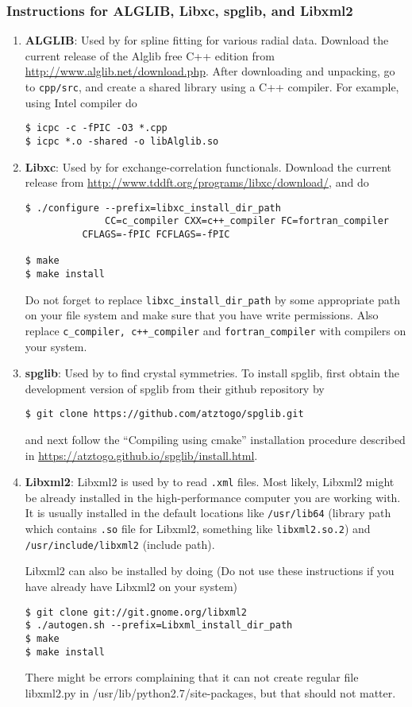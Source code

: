 \subsubsection{Instructions for ALGLIB, Libxc, spglib, and Libxml2}
\begin{enumerate}
	\item   {\bf ALGLIB}: Used by \dftfe{} for spline fitting for various radial data. Download the current release of the Alglib free C++ edition from \url{http://www.alglib.net/download.php}. After downloading and unpacking, go to \verb|cpp/src|, and create a shared library using a C++ compiler. For example, using Intel compiler do
\begin{verbatim}
$ icpc -c -fPIC -O3 *.cpp
$ icpc *.o -shared -o libAlglib.so
\end{verbatim}
\item {\bf Libxc}: Used by \dftfe{} for exchange-correlation functionals. Download the current release from \url{http://www.tddft.org/programs/libxc/download/}, and do 
\begin{verbatim}
$ ./configure --prefix=libxc_install_dir_path
              CC=c_compiler CXX=c++_compiler FC=fortran_compiler
	      CFLAGS=-fPIC FCFLAGS=-fPIC
     
$ make
$ make install
\end{verbatim}
Do not forget to replace \verb|libxc_install_dir_path| by some appropriate path on your file system and make sure that you have write permissions. Also replace \verb|c_compiler, c++_compiler| and \verb|fortran_compiler| with compilers on your system.

\item {\bf spglib}: Used by \dftfe{} to find crystal symmetries. To install spglib, first obtain the development version of spglib from their github repository by
\begin{verbatim}
$ git clone https://github.com/atztogo/spglib.git	
\end{verbatim}	
and next follow the ``Compiling using cmake'' installation procedure described in \url{https://atztogo.github.io/spglib/install.html}.   	

\item {\bf Libxml2}: Libxml2 is used by \dftfe{} to read \verb|.xml| files. Most likely, Libxml2 might be already installed in the high-performance computer you are working with. It is usually installed in the default locations like \verb|/usr/lib64| (library path which contains \verb|.so| file for Libxml2, something like \verb|libxml2.so.2|) and \verb|/usr/include/libxml2| (include path). 

Libxml2 can also be installed by doing (Do not use these instructions if you have already have Libxml2 on your system)
\begin{verbatim}
$ git clone git://git.gnome.org/libxml2
$ ./autogen.sh --prefix=Libxml_install_dir_path
$ make
$ make install 
\end{verbatim}
There might be errors complaining that it can not create regular file libxml2.py in /usr/lib/python2.7/site-packages, but that should not matter.
\end{enumerate}

